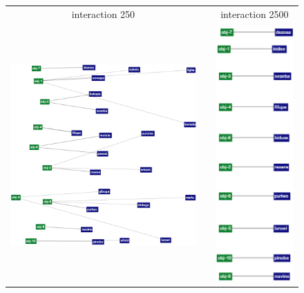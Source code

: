 \begin{figure}[t]
  \begin{tabular}{@{}cp{0.20cm}c@{}}
    interaction 250 & & interaction 2500 \\
    & & \\
    \includegraphics[scale=0.31]{figures/ng-lexicon-250} & &
    \includegraphics[scale=0.31]{figures/ng-lexicon-2500} \\

\end{tabular}
\end{figure}
